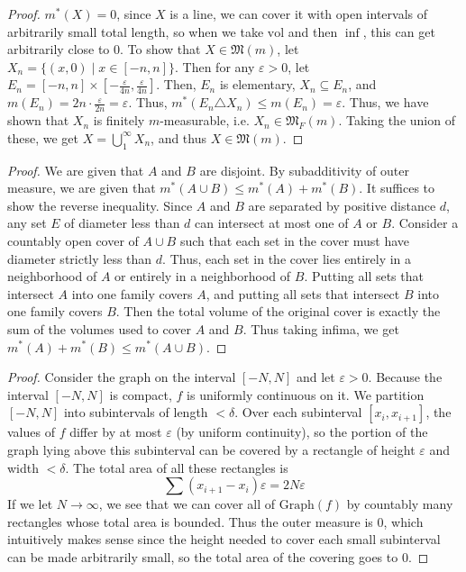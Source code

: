 \documentclass[11pt]{article}
\let\eps\varepsilon
\begin{document}
\begin{exercise}{3}
    \begin{proof}
        $m^*(X) = 0$, since $X$ is a line, we can cover it with open intervals of arbitrarily small total length, so when we take $\mathrm{vol}$ and then $\inf$, this can get arbitrarily close to 0. To show that $X \in \mathfrak{M}(m)$, let $X_n = \{ (x, 0) \mid x \in [-n, n] \}$. Then for any $\eps > 0$, let $E_n = [-n, n] \times \left[ - \frac{\eps}{4n}, \frac{\eps}{4n} \right]$. Then, $E_n$ is elementary, $X_n \subseteq E_n$, and $m(E_n) = 2n \cdot \frac{\eps}{2n} = \eps$. Thus, $m^*(E_n \triangle X_n) \le m(E_n) = \eps$. Thus, we have shown that $X_n$ is finitely $m$-measurable, i.e. $X_n \in \mathfrak{M}_F(m)$. Taking the union of these, we get $X = \bigcup_1^\infty X_n$, and thus $X \in \mathfrak{M}(m)$.
    \end{proof}
\end{exercise}

\begin{exercise}{4}
    \begin{proof}
        We are given that $A$ and $B$ are disjoint. By subadditivity of outer measure, we are given that $m^*(A \cup B) \le m^*(A) + m^*(B)$. It suffices to show the reverse inequality. Since $A$ and $B$ are separated by positive distance $d$, any set $E$ of diameter less than $d$ can intersect at most one of $A$ or $B$. Consider a countably open cover of $A \cup B$ such that each set in the cover must have diameter strictly less than $d$. Thus, each set in the cover lies entirely in a neighborhood of $A$ or entirely in a neighborhood of $B$. Putting all sets that intersect $A$ into one family covers $A$, and putting all sets that intersect $B$ into one family covers $B$. Then the total volume of the original cover is exactly the sum of the volumes used to cover $A$ and $B$. Thus taking infima, we get $m^*(A) + m^*(B) \le m^*(A \cup B)$. 
    \end{proof}
\end{exercise}

\begin{exercise}{5}
    \begin{proof}
        Consider the graph on the interval $[-N, N]$ and let $\eps > 0$. Because the interval $[-N, N]$ is compact, $f$ is uniformly continuous on it. We partition $[-N, N]$ into subintervals of length $< \delta$. Over each subinterval $[x_i, x_{i + 1}]$, the values of $f$ differ by at most $\eps$ (by uniform continuity), so the portion of the graph lying above this subinterval can be covered by a rectangle of height $\eps$ and width $< \delta$. The total area of all these rectangles is $$\sum (x_{i + 1} - x_i) \eps = 2N\eps$$ If we let $N \to \infty$, we see that we can cover all of $\mathrm{Graph}(f)$ by countably many rectangles whose total area is bounded. Thus the outer measure is 0, which intuitively makes sense since the height needed to cover each small subinterval can be made arbitrarily small, so the total area of the covering goes to 0.
    \end{proof}
\end{exercise}
\end{document}
